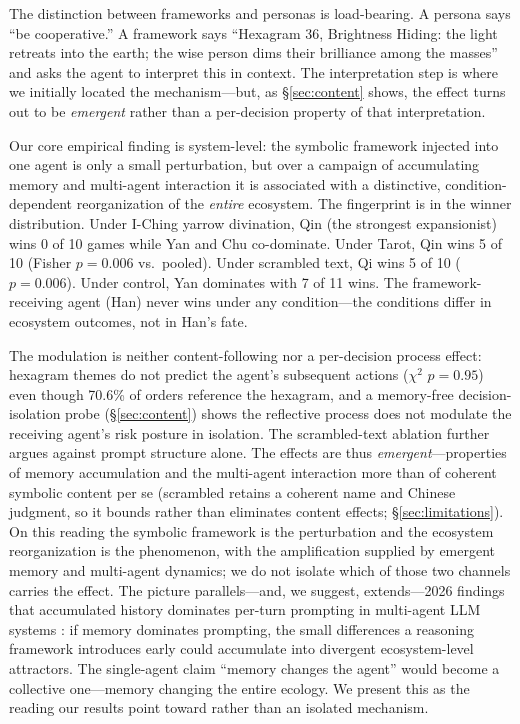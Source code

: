 \documentclass[11pt]{article}
\begin{document}
The distinction between frameworks and personas is load-bearing. A persona says ``be cooperative.'' A framework says ``Hexagram 36, Brightness Hiding: the light retreats into the earth; the wise person dims their brilliance among the masses'' and asks the agent to interpret this in context. The interpretation step is where we initially located the mechanism---but, as \S\ref{sec:content} shows, the effect turns out to be \emph{emergent} rather than a per-decision property of that interpretation.

Our core empirical finding is system-level: the symbolic framework injected into one agent is only a small perturbation, but over a campaign of accumulating memory and multi-agent interaction it is associated with a distinctive, condition-dependent reorganization of the \emph{entire} ecosystem. The fingerprint is in the winner distribution. Under I-Ching yarrow divination, Qin (the strongest expansionist) wins 0 of 10 games while Yan and Chu co-dominate. Under Tarot, Qin wins 5 of 10 (Fisher $p = 0.006$ vs.\ pooled). Under scrambled text, Qi wins 5 of 10 ($p = 0.006$). Under control, Yan dominates with 7 of 11 wins. The framework-receiving agent (Han) never wins under any condition---the conditions differ in ecosystem outcomes, not in Han's fate.

The modulation is neither content-following nor a per-decision process effect: hexagram themes do not predict the agent's subsequent actions ($\chi^2$ $p = 0.95$) even though 70.6\% of orders reference the hexagram, and a memory-free decision-isolation probe (\S\ref{sec:content}) shows the reflective process does not modulate the receiving agent's risk posture in isolation. The scrambled-text ablation further argues against prompt structure alone. The effects are thus \emph{emergent}---properties of memory accumulation and the multi-agent interaction more than of coherent symbolic content per se (scrambled retains a coherent name and Chinese judgment, so it bounds rather than eliminates content effects; \S\ref{sec:limitations}). On this reading the symbolic framework is the perturbation and the ecosystem reorganization is the phenomenon, with the amplification supplied by emergent memory and multi-agent dynamics; we do not isolate which of those two channels carries the effect. The picture parallels---and, we suggest, extends---2026 findings that accumulated history dominates per-turn prompting in multi-agent LLM systems \citep{MemoryCurse2026}: if memory dominates prompting, the small differences a reasoning framework introduces early could accumulate into divergent ecosystem-level attractors. The single-agent claim ``memory changes the agent'' would become a collective one---memory changing the entire ecology. We present this as the reading our results point toward rather than an isolated mechanism.
\end{document}
